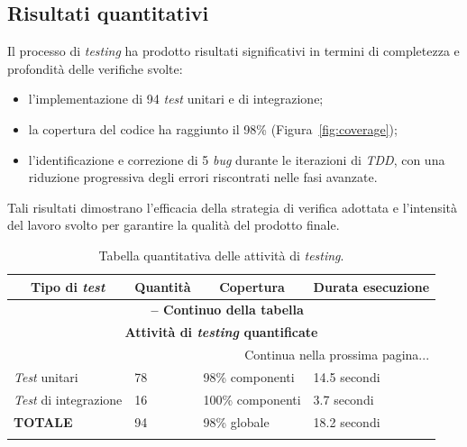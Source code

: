 \subsection{Risultati quantitativi}
Il processo di \textit{testing} ha prodotto risultati significativi in termini di completezza e profondità delle verifiche svolte:
\begin{itemize}
    \item l'implementazione di 94 \textit{test} unitari e di integrazione;
    \item la copertura del codice ha raggiunto il 98\% (Figura~\ref{fig:coverage});
    \item l'identificazione e correzione di 5 \textit{bug} durante le iterazioni di \textit{TDD}, con una riduzione progressiva degli errori riscontrati nelle fasi avanzate.
\end{itemize}
Tali risultati dimostrano l'efficacia della strategia di verifica adottata e l'intensità del lavoro svolto per garantire la qualità del prodotto finale.  

\begin{center}
\begin{longtable}{|p{}|p{}|p{}|p{}|}
\hline
\multicolumn{1}{|c|}{\textbf{Tipo di \textit{test}}} & 
\multicolumn{1}{c|}{\textbf{Quantità}} & 
\multicolumn{1}{c|}{\textbf{Copertura}} & 
\multicolumn{1}{c|}{\textbf{Durata esecuzione}} \\ 
\hline
\endfirsthead

\multicolumn{4}{c}{{\bfseries \tablename\ \thetable{} -- Continuo della tabella}}\\
\hline
\multicolumn{4}{|c|}{\textbf{Attività di \textit{testing} quantificate}} \\ \hline
\endhead

\hline \multicolumn{4}{|r|}{{Continua nella prossima pagina...}} \\ \hline
\endfoot

\endlastfoot

\textit{Test} unitari & 78 & 98\% componenti & 14.5 secondi \\ \hline
\textit{Test} di integrazione & 16 & 100\% componenti & 3.7 secondi \\ \hline
\textbf{TOTALE} & 94 & 98\% globale & 18.2 secondi \\ \hline

\caption{Tabella quantitativa delle attività di \textit{testing}.}
\label{tab:attivita-testing}
\end{longtable}
\end{center}

